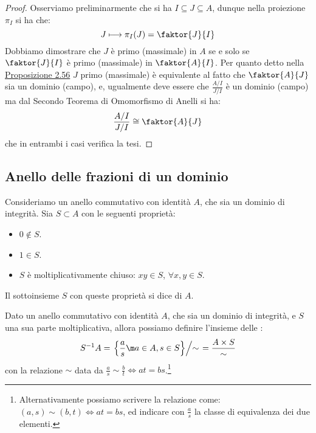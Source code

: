 \documentclass[11pt]{scrartcl}
\begin{document}
\begin{proof}
    Osserviamo preliminarmente che si ha $I \subseteq J \subseteq A$, dunque nella proiezione $\pi_I$ si ha che:
        \[ J \longmapsto \pi_I(J) = \faktor{J}{I}
            \]
    Dobbiamo dimostrare che $J$ è primo (massimale) in $A$ se e solo se $\faktor{J}{I}$ è primo (massimale) in $\faktor{A}{I}$. Per quanto detto nella \hyperref[2.56]{Proposizione 2.56} $J$ primo (massimale) 
    è equivalente al fatto che $\faktor{A}{J}$ sia un dominio (campo), e, ugualmente deve essere che $\displaystyle\frac{A/I}{J/I}$ è un dominio (campo) ma dal Secondo Teorema di Omomorfismo di Anelli si ha:
    \[ \frac{A/I}{J/I} \cong \faktor{A}{J}
        \]
    che in entrambi i casi verifica la tesi.
\end{proof}

\newpage
\subsection{Anello delle frazioni di un dominio}

\begin{definition}
    Consideriamo un anello commutativo con identità $A$, che sia un dominio di integrità. Sia $S \subset A$ con le seguenti proprietà:
    \begin{itemize}
        \item $0 \not\in S$.
        \item $1 \in S$.
        \item $S$ è moltiplicativamente chiuso: $xy \in S$, $\forall x,y \in S$.
    \end{itemize}
    Il sottoinsieme $S$ con queste proprietà si dice  di $A$.
\end{definition}

\begin{definition}
    Dato un anello commutativo con identità $A$, che sia un dominio di integrità, e $S$ una sua parte moltiplicativa, allora possiamo definire l'insieme delle :
    \[ S^{-1}A = \left.\left\{\frac{a}{s} \m a\in A, s \in S\right\} \middle/ \sim \right. = \frac{A \times S}{\sim}
        \]
    con la relazione $\sim$ data da $\displaystyle\frac{a}{s} \sim \frac{b}{t} \iff at = bs$.\footnote{Alternativamente possiamo scrivere la relazione come: $(a,s) \sim (b,t) \iff at = bs$, ed indicare con $\displaystyle\frac{a}{s}$ la classe di equivalenza dei due elementi.}
\end{definition}
\end{document}
